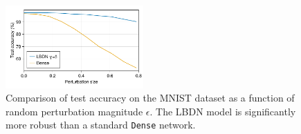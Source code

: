 \begin{figure}[!b]
    \centering
    \includegraphics[width=0.47\textwidth]{Images/lbdn_mnist_robust.pdf}
    \caption{Comparison of test accuracy on the MNIST dataset as a function of random perturbation magnitude $\epsilon$. The LBDN model is significantly more robust than a standard \texttt{Dense} network.}
    \label{fig:mnist_robust}
\end{figure}
